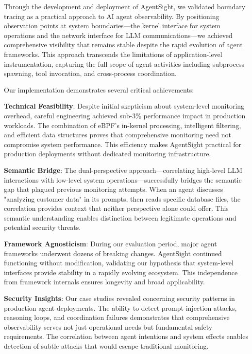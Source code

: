 \documentclass[sigplan,screen，review,9pt]{acmart}
\begin{document}
Through the development and deployment of AgentSight, we validated boundary tracing as a practical approach to AI agent observability. By positioning observation points at system boundaries—the kernel interface for system operations and the network interface for LLM communications—we achieved comprehensive visibility that remains stable despite the rapid evolution of agent frameworks. This approach transcends the limitations of application-level instrumentation, capturing the full scope of agent activities including subprocess spawning, tool invocation, and cross-process coordination.

Our implementation demonstrates several critical achievements:

\textbf{Technical Feasibility}: Despite initial skepticism about system-level monitoring overhead, careful engineering achieved sub-3\% performance impact in production workloads. The combination of eBPF's in-kernel processing, intelligent filtering, and efficient data structures proves that comprehensive monitoring need not compromise system performance. This efficiency makes AgentSight practical for production deployments without dedicated monitoring infrastructure.

\textbf{Semantic Bridge}: The dual-perspective approach—correlating high-level LLM interactions with low-level system operations—successfully bridges the semantic gap that plagued previous monitoring attempts. When an agent discusses "analyzing customer data" in its prompts, then reads specific database files, the correlation provides context that neither perspective alone could offer. This semantic understanding enables distinction between legitimate operations and potential security threats.

\textbf{Framework Agnosticism}: During our evaluation period, major agent frameworks underwent dozens of breaking changes. AgentSight continued functioning without modification, validating our hypothesis that system-level interfaces provide stability in a rapidly evolving ecosystem. This independence from framework internals ensures longevity and broad applicability.

\textbf{Security Insights}: Our case studies revealed concerning security patterns in production agent deployments. The ability to detect prompt injection attacks, reasoning loops, and coordination failures demonstrates that comprehensive observability serves not just operational needs but fundamental safety requirements. The correlation between agent intentions and system effects enables detection of subtle attacks that would escape traditional monitoring.
\end{document}
